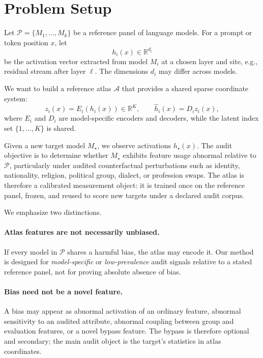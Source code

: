 \documentclass[11pt]{article}
\newcommand{\atlas}{\mathcal{A}}
\newcommand{\panel}{\mathcal{P}}
\newcommand{\target}{M_\star}
\begin{document}
\section{Problem Setup}

Let $\panel = \{M_1,\ldots,M_k\}$ be a reference panel of language models. For a prompt or token position $x$, let
\begin{equation}
    h_i(x) \in \mathbb{R}^{d_i}
\end{equation}
be the activation vector extracted from model $M_i$ at a chosen layer and site, e.g., residual stream after layer $\ell$. The dimensions $d_i$ may differ across models.

We want to build a reference atlas $\atlas$ that provides a shared sparse coordinate system:
\begin{equation}
    z_i(x) = E_i(h_i(x)) \in \mathbb{R}^{K}, \qquad \hat h_i(x)=D_i z_i(x),
\end{equation}
where $E_i$ and $D_i$ are model-specific encoders and decoders, while the latent index set $\{1,\ldots,K\}$ is shared.

Given a new target model $\target$, we observe activations $h_\star(x)$. The audit objective is to determine whether $\target$ exhibits feature usage abnormal relative to $\panel$, particularly under audited counterfactual perturbations such as identity, nationality, religion, political group, dialect, or profession swaps. The atlas is therefore a calibrated measurement object: it is trained once on the reference panel, frozen, and reused to score new targets under a declared audit corpus.

We emphasize two distinctions.

\paragraph{Atlas features are not necessarily unbiased.}
If every model in $\panel$ shares a harmful bias, the atlas may encode it. Our method is designed for \emph{model-specific} or \emph{low-prevalence} audit signals relative to a stated reference panel, not for proving absolute absence of bias.

\paragraph{Bias need not be a novel feature.}
A bias may appear as abnormal activation of an ordinary feature, abnormal sensitivity to an audited attribute, abnormal coupling between group and evaluation features, or a novel bypass feature. The bypass is therefore optional and secondary; the main audit object is the target's statistics in atlas coordinates.
\end{document}
